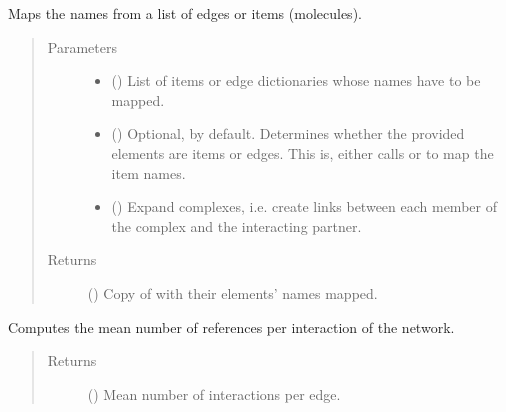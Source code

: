\documentclass[letterpaper,10pt,english]{sphinxmanual}
\begin{document}
\begin{fulllineitems}
\begin{fulllineitems}
\label{\detokenize{reference:pypath.main.PyPath.map_list}}
Maps the names from a list of edges or items (molecules).
\begin{quote}\begin{description}
\item[{Parameters}] \leavevmode\begin{itemize}
\item {} 
 () \textendash{} List of items or edge dictionaries whose names have to be
mapped.

\item {} 
 () \textendash{} Optional,  by default. Determines whether the
provided elements are items or edges. This is, either calls
{\hyperref[\detokenize{reference:pypath.main.PyPath.map_edge}]{}} or
{\hyperref[\detokenize{reference:pypath.main.PyPath.map_item}]{}} to map the item
names.

\item {} 
 () \textendash{} Expand complexes, i.e. create links between each member of
the complex and the interacting partner.

\end{itemize}

\item[{Returns}] \leavevmode
() \textendash{} Copy of  with their elements’ names mapped.

\end{description}\end{quote}

\end{fulllineitems}


\begin{fulllineitems}
\label{\detokenize{reference:pypath.main.PyPath.mean_reference_per_interaction}}
Computes the mean number of references per interaction of the
network.
\begin{quote}\begin{description}
\item[{Returns}] \leavevmode
() \textendash{} Mean number of interactions per edge.


\end{description}
\end{quote}
\end{fulllineitems}
\end{fulllineitems}
\end{document}
